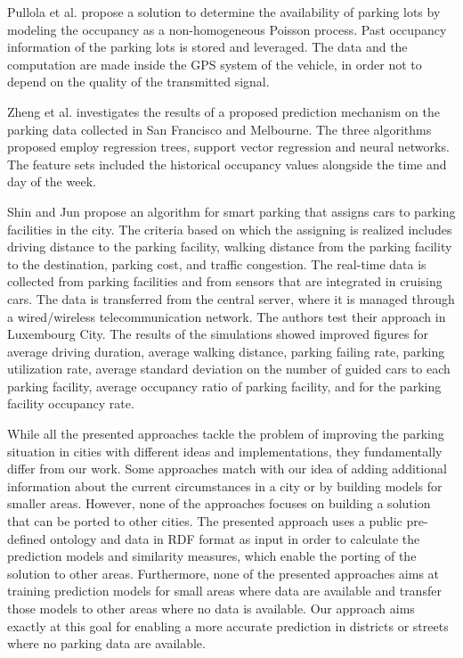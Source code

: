 Pullola et al. \cite{pullola} propose a solution to determine the availability of parking lots by modeling the occupancy as a non-homogeneous Poisson process. Past occupancy information of the parking lots is stored and leveraged. The data and the computation are made inside the GPS system of the vehicle, in order not to depend on the quality of the transmitted signal. 

Zheng et al. \cite{zheng} investigates the results of a proposed prediction mechanism on the parking data collected in San Francisco and Melbourne. The three algorithms proposed employ regression trees, support vector regression and neural networks. The feature sets included the historical occupancy values alongside the time and day of the week.

Shin and Jun \cite{shin} propose an algorithm for smart parking that assigns cars to parking facilities in the city. The criteria based on which the assigning is realized includes driving distance to the parking facility, walking distance from the parking facility to the destination, parking cost, and traffic congestion. The real-time data is collected from parking facilities and from sensors that are integrated in cruising cars. The data is transferred from the central server, where it is managed through a wired/wireless telecommunication network. The authors test their approach in Luxembourg City. The results of the simulations showed improved figures for average driving duration, average walking distance, parking failing rate, parking utilization rate, average standard deviation on the number of guided cars to each parking facility, average occupancy ratio of parking facility, and for the parking facility occupancy rate.  

While all the presented approaches tackle the problem of improving the parking situation in cities with different ideas and implementations, they fundamentally differ from our work. 
Some approaches match with our idea of adding additional information about the current circumstances in a city or by building models for smaller areas.
However, none of the approaches focuses on building a solution that can be ported to other cities. 
The presented approach uses a public pre-defined ontology and data in RDF format as input in order to calculate the prediction models and similarity measures, which enable the porting of the solution to other areas. 
Furthermore, none of the presented approaches aims at training prediction models for small areas where data are available and transfer those models to other areas where no data is available. Our approach aims exactly at this goal for enabling a more accurate prediction in districts or streets where no parking data are available. 

